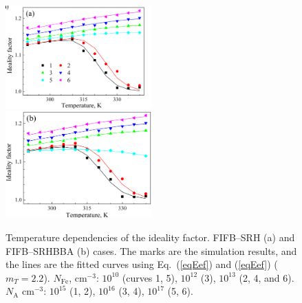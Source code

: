 \documentclass [sort&compress] {elsarticle}
\begin{document}
\begin{figure}
\includegraphics[width=0.5\textwidth]{FigS6a}%
\includegraphics[width=0.5\textwidth]{FigS6b}
\caption{\label{figS6}
Temperature dependencies of the ideality factor.
FIFB--SRH (a) and FIFB--SRHBBA (b) cases.
The marks are the simulation results, and the lines are the fitted curves using Eq.~(\ref{eqEef}) and (\ref{eqEef}) ($m_T = 2.2$).
$N_\mathrm{Fe}$, cm$^{-3}$: $10^{10}$ (curves 1, 5), $10^{12}$ (3), $10^{13}$ (2, 4, and 6).
$N_\mathrm{A}$ cm$^{-3}$: $10^{15}$ (1, 2), $10^{16}$ (3,  4), $10^{17}$ (5, 6).
}%
\end{figure}
\end{document}
